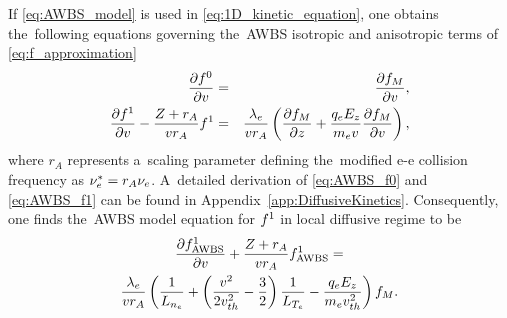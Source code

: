 If \eqref{eq:AWBS_model} is used in \eqref{eq:1D_kinetic_equation}, one obtains
the~following equations governing the~AWBS isotropic and anisotropic terms of 
\eqref{eq:f_approximation}
\begin{eqnarray}
  \frac{\partial{f^0}}{\partial{v}} &=& \frac{\partial{f_M}}{\partial{v}} ,
  \label{eq:AWBS_f0} \\
  \frac{\partial{f^1}}{\partial{v}}  
  - \frac{Z +  r_A}{v r_A} f^1 &=& 
  \frac{\lambda_e}{v r_A}
  \left(\frac{\partial{f_M}}{\partial{z}} + \frac{q_eE_z}{m_ev}\frac{\partial{f_M}}{\partial{v}}\right) ,
  \label{eq:AWBS_f1} 
\end{eqnarray}
where $ r_A$ represents a~scaling parameter defining the~modified
e-e collision frequency as $\nu_{e}^* =  r_A \nu_{e}$.
A~detailed derivation of \eqref{eq:AWBS_f0} and \eqref{eq:AWBS_f1} 
can be found in Appendix~\ref{app:DiffusiveKinetics}.
Consequently, one finds the~AWBS model equation for $f^1$ 
in local diffusive regime to be
\begin{multline}
  \frac{\partial{f^1_{\text{AWBS}}}}{\partial{v}} 
  + \frac{Z +  r_A}{v r_A}f^1_{\text{AWBS}}
  = \\
  \frac{\lambda_e}{v r_A}\left(\frac{1}{L_{n_e}} + 
  \left( \frac{v^2}{2 v_{th}^2} - \frac{3}{2}\right)
  \frac{1}{L_{T_e}} - \frac{q_eE_z}{m_ev_{th}^2}\right)f_M .
  \label{eq:AWBS_f1_ODE}
\end{multline}
